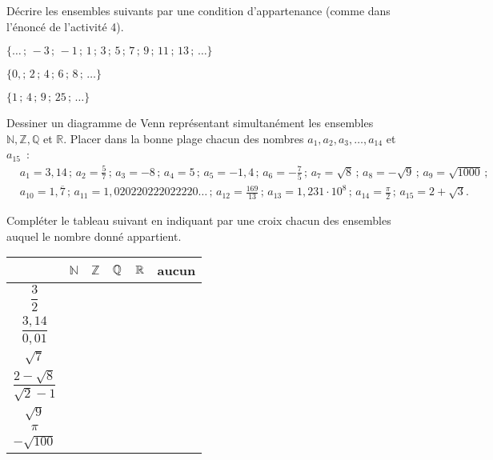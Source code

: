 \documentclass[a4paper,12pt]{report}
\begin{document}
\begin{exo}
Décrire les ensembles suivants par une condition d'appartenance (comme dans l'énoncé de l'activité 4).
\begin{center}
\begin{inlineumerate}
\item $\{\ldots\,;\,-3\,;\,-1\,;\,1\,;\,3\,;\,5\,;\,7\,;\,9\,;\,11\,;\,13\,;\,\ldots\}$
\item $\{0,;\,2\,;\,4\,;\,6\,;\,8\,;\,\ldots\}$
\item $\{1\,;\,4\,;\,9\,;\,25\,;\,\ldots\}$
\end{inlineumerate}
\end{center}
\end{exo}

\begin{exo}
Dessiner un diagramme de Venn représentant simultanément les ensembles $\mathbb{N}, \mathbb{Z}, \mathbb{Q}$ et $\mathbb{R}$. Placer dans la bonne plage chacun des nombres $a_1, a_2, a_3, \ldots, a_{14}$ et $a_{15}$~:
\[
\begin{aligned}
& a_1=3,14\,;\,a_2=\frac{5}{7}\,;\,a_3=-8\,;\,a_4=5\,;\,a_5=-1,4\,;\,a_6=-\frac{7}{5}\,;\,a_7=\sqrt{8}\,;\,a_8=-\sqrt{9}\,;\,a_9=\sqrt{1000}\,;\,\\
& a_{10}=1, \overline{7}\,;\,a_{11}=1,020220222022220 \ldots\,;\,a_{12}=\frac{169}{13}\,;\,a_{13}=1,231 \cdot 10^8\,;\,a_{14}=\frac{\pi}{2}\,;\,a_{15}=2+\sqrt{3} .
\end{aligned}
\]
\end{exo}
\begin{exo}
Compléter le tableau suivant en indiquant par une croix chacun des ensembles auquel le nombre donné appartient.
\begin{center}
\begin{tabular}{c|c|c|c|c|c|} 
& $\mathbb{N}$ & $\mathbb{Z}$ & $\mathbb Q$ & $\mathbb R$ & aucun \\
\hline\rule{0pt}{4ex}
	$\dfrac{3}{2}$ & & & & & \\[2ex]
\hline\rule{0pt}{4ex}
	$\dfrac{3,14}{0,01}$ & & & & & \\[2ex]
\hline\rule{0pt}{3ex}
$\sqrt{7}$ & & & & & \\
\hline\rule{0pt}{4ex}
$\dfrac{2-\sqrt{8}}{\sqrt{2}-1}$ & & & & & \\[2ex]
\hline\rule{0pt}{3ex}
$\sqrt{9}$ & & & & & \\
\hline$\pi$ & & & & & \\
\hline\rule{0pt}{3ex}
$-\sqrt{100}$ & & & & & \\
\hline
\end{tabular}
\end{center}
\end{exo}
\end{document}
